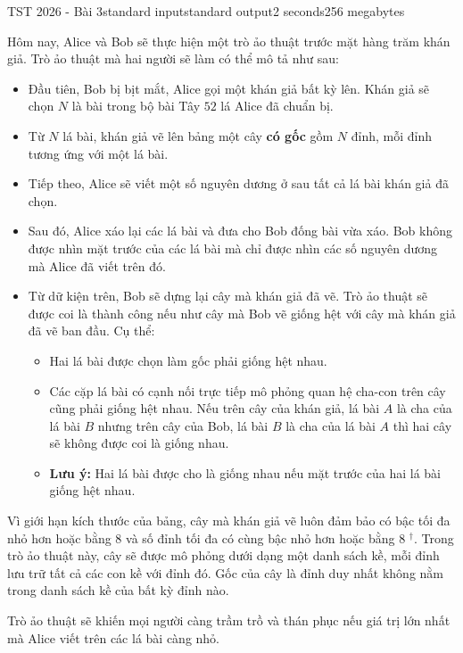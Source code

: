 \begin{problem}{TST 2026 - Bài 3}{standard input}{standard output}{2 seconds}{256 megabytes}

Hôm nay, Alice và Bob sẽ thực hiện một trò ảo thuật trước mặt hàng trăm khán giả. Trò ảo thuật mà hai người sẽ làm có thể mô tả như sau:
\begin{itemize}
   \item Đầu tiên, Bob bị bịt mắt, Alice gọi một khán giả bất kỳ lên. Khán giả sẽ chọn $N$ là bài trong bộ bài Tây $52$ lá Alice đã chuẩn bị.
   \item Từ $N$ lá bài, khán giả vẽ lên bảng một cây \textbf{có gốc} gồm $N$ đỉnh, mỗi đỉnh tương ứng với một lá bài.
   \item Tiếp theo, Alice sẽ viết một số nguyên dương ở sau tất cả lá bài khán giả đã chọn.
   \item Sau đó, Alice xáo lại các lá bài và đưa cho Bob đống bài vừa xáo. Bob không được nhìn mặt trước của các lá bài mà chỉ được nhìn các số nguyên dương mà Alice đã viết trên đó.
   \item Từ dữ kiện trên, Bob sẽ dựng lại cây mà khán giả đã vẽ. Trò ảo thuật sẽ được coi là thành công nếu như cây mà Bob vẽ giống hệt với cây mà khán giả đã vẽ ban đầu. Cụ thể:
   \begin{itemize}
      \item Hai lá bài được chọn làm gốc phải giống hệt nhau.
      \item Các cặp lá bài có cạnh nối trực tiếp mô phỏng quan hệ cha-con trên cây cũng phải giống hệt nhau. Nếu trên cây của khán giả, lá bài $A$ là cha của lá bài $B$ nhưng trên cây của Bob, lá bài $B$ là cha của lá bài $A$ thì hai cây sẽ không được coi là giống nhau.
      \item \textbf{Lưu ý:} Hai lá bài được cho là giống nhau nếu mặt trước của hai lá bài giống hệt nhau.
   \end{itemize}
\end{itemize}

Vì giới hạn kích thước của bảng, cây mà khán giả vẽ luôn đảm bảo có bậc tối đa nhỏ hơn hoặc bằng $8$ và số đỉnh tối đa có cùng bậc nhỏ hơn hoặc bằng $8$ $^\dagger$. Trong trò ảo thuật này, cây sẽ được mô phỏng dưới dạng một danh sách kề, mỗi đỉnh lưu trữ tất cả các con kề với đỉnh đó. Gốc của cây là đỉnh duy nhất không nằm trong danh sách kề của bất kỳ đỉnh nào.

Trò ảo thuật sẽ khiến mọi người càng trầm trồ và thán phục nếu giá trị lớn nhất mà Alice viết trên các lá bài càng nhỏ.


\end{problem}
